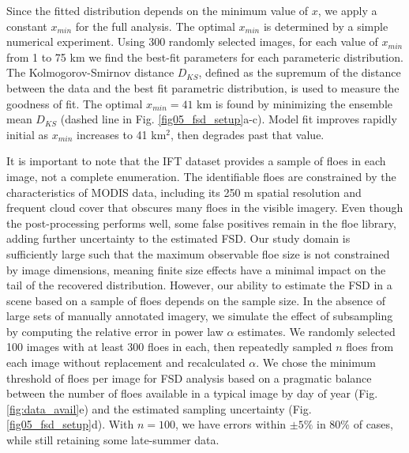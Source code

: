 \documentclass[aog]{igs}
\begin{document}
\begin{figure*}
\caption{Ensemble mean (solid line), standard deviation (dark shading), and min-max range (light shading) of $D_{KS}$ for the best-fit parametric distribution as a function of $x_{min}$ for (a) power law, (b) truncated power law, and (c) lognormal distributions.  Vertical dashed lines mark $x_{min}=$41 km$^2$. (d) Relative error in power law $\alpha$ estimate by subsample size relative to images with greater than 300 floes. Shading as in (a-c).}
\label{fig05_fsd_setup}
\end{figure*}

Since the fitted distribution depends on the minimum value of $x$, we apply a constant $x_{min}$ for the full analysis.
The optimal $x_{min}$ is determined by a simple numerical experiment. Using 300 randomly selected images, for each value of $x_{min}$ from 1 to 75 km we find the best-fit parameters for each parameteric distribution. The Kolmogorov-Smirnov distance $D_{KS}$, defined as the supremum of the distance between the data and the best fit parametric distribution, is used to measure the goodness of fit. The optimal $x_{min} = 41$ km is found by minimizing the ensemble mean $D_{KS}$ (dashed line in Fig. \ref{fig05_fsd_setup}a-c). Model fit improves rapidly initial as $x_{min}$ increases to 41 km$^2$, then degrades past that value.

It is important to note that the IFT dataset provides a sample of floes in each image, not a complete enumeration.
The identifiable floes are constrained by the characteristics of MODIS data, including its 250 m spatial resolution and frequent cloud cover that obscures many floes in the visible imagery.
Even though the post-processing performs well, some false positives remain in the floe library, adding further uncertainty to the estimated FSD.
Our study domain is sufficiently large such that the maximum observable floe size is not constrained by image dimensions, meaning finite size effects \citep{stern2018_ReconcilingDisparate} have a minimal impact on the tail of the recovered distribution.
However, our ability to estimate the FSD in a scene based on a sample of floes depends on the sample size. In the absence of large sets of manually annotated imagery, we simulate the effect of subsampling by computing the relative error in power law $\alpha$ estimates. We randomly selected 100 images with at least 300 floes in each, then repeatedly sampled $n$ floes from each image without replacement and recalculated $\alpha$. We chose the minimum threshold of floes per image for FSD analysis based on a pragmatic balance between the number of floes available in a typical image by day of year (Fig. \ref{fig:data_avail}e) and the estimated sampling uncertainty (Fig. \ref{fig05_fsd_setup}d). With $n=100$, we have errors within $\pm 5\%$ in 80\% of cases, while still retaining some late-summer data.
\end{document}
